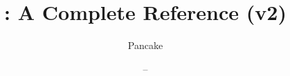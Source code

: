 \documentclass[12pt, a4paper, english]{pancake-book}
\begin{document}
\title{\langname : A Complete Reference (v2)}
\author{Pancake}
\date{ -- \DTMtoday}

\frontmatter

\maketitle
\tableofcontents

\printglossaries
\mainmatter
\end{document}
